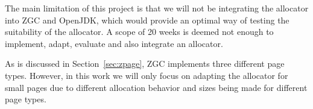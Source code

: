
The main limitation of this project is that we will not be integrating the allocator into ZGC and OpenJDK, which would provide an optimal way of testing the suitability of the allocator. A scope of 20 weeks is deemed not enough to implement, adapt, evaluate and also integrate an allocator.

As is discussed in Section~\ref{sec:zpage}, ZGC implements three different page types. However, in this work we will only focus on adapting the allocator for small pages due to different allocation behavior and sizes being made for different page types.


